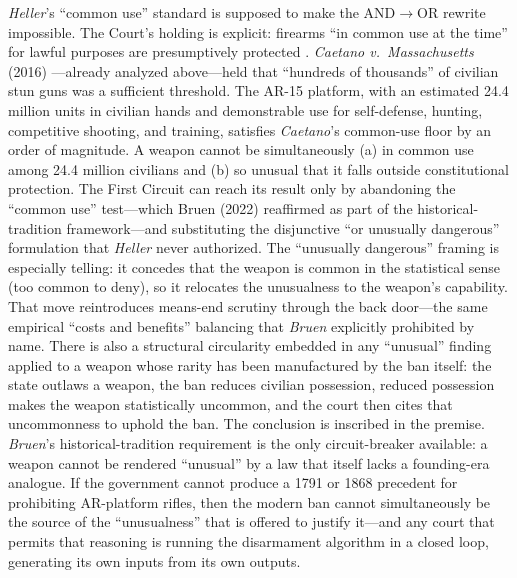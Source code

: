 \textit{Heller}'s ``common use'' standard is supposed to make the AND$\to$OR rewrite impossible. The Court's holding is explicit: firearms ``in common use at the time'' for lawful purposes are presumptively protected \cite{heller}. \textit{Caetano v.\ Massachusetts} (2016) \cite{caetano}---already analyzed above---held that ``hundreds of thousands'' of civilian stun guns was a sufficient threshold. The AR-15 platform, with an estimated 24.4 million units in civilian hands and demonstrable use for self-defense, hunting, competitive shooting, and training, satisfies \textit{Caetano}'s common-use floor by an order of magnitude. A weapon cannot be simultaneously (a) in common use among 24.4 million civilians and (b) so unusual that it falls outside constitutional protection. The First Circuit can reach its result only by abandoning the ``common use'' test---which Bruen (2022) \cite{bruen} reaffirmed as part of the historical-tradition framework---and substituting the disjunctive ``or unusually dangerous'' formulation that \textit{Heller} never authorized. The ``unusually dangerous'' framing is especially telling: it concedes that the weapon is common in the statistical sense (too common to deny), so it relocates the unusualness to the weapon's capability. That move reintroduces means-end scrutiny through the back door---the same empirical ``costs and benefits'' balancing that \textit{Bruen} explicitly prohibited by name. There is also a structural circularity embedded in any ``unusual'' finding applied to a weapon whose rarity has been manufactured by the ban itself: the state outlaws a weapon, the ban reduces civilian possession, reduced possession makes the weapon statistically uncommon, and the court then cites that uncommonness to uphold the ban. The conclusion is inscribed in the premise. \textit{Bruen}'s historical-tradition requirement is the only circuit-breaker available: a weapon cannot be rendered ``unusual'' by a law that itself lacks a founding-era analogue. If the government cannot produce a 1791 or 1868 precedent for prohibiting AR-platform rifles, then the modern ban cannot simultaneously be the source of the ``unusualness'' that is offered to justify it---and any court that permits that reasoning is running the disarmament algorithm in a closed loop, generating its own inputs from its own outputs.

